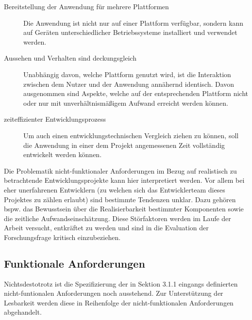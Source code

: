 \begin{description}
    \item[Bereitstellung der Anwendung für mehrere Plattformen] Die Anwendung ist nicht nur auf einer Plattform verfügbar, sondern kann auf Geräten unterschiedlicher Betriebssysteme installiert und verwendet werden.
    \item[Aussehen und Verhalten sind deckungsgleich] Unabhängig davon, welche Plattform genutzt wird, ist die Interaktion zwischen dem Nutzer und der Anwendung annähernd identisch. Davon ausgenommen sind Aspekte, welche auf der entsprechenden Plattform nicht oder nur mit unverhältnismäßigem Aufwand erreicht werden können.
    \item[zeiteffizienter Entwicklungsprozess] Um auch einen entwicklungstechnischen Vergleich ziehen zu können, soll die Anwendung in einer dem Projekt angemessenen Zeit vollständig entwickelt werden können.
\end{description}
Die Problematik nicht-funktionaler Anforderungen im Bezug auf realistisch zu betrachtende Entwicklungsprojekte kann hier interpretiert werden. Vor allem bei eher unerfahrenen Entwicklern (zu welchen sich das Entwicklerteam dieses Projektes zu zählen erlaubt) sind bestimmte Tendenzen unklar. Dazu gehören bspw. das Bewusstsein über die Realisierbarkeit bestimmter Komponenten sowie die zeitliche Aufwandseinschätzung. Diese Störfaktoren werden im Laufe der Arbeit versucht, entkräftet zu werden und sind in die Evaluation der Forschungsfrage kritisch einzubeziehen.

\subsection{Funktionale Anforderungen}
Nichtsdestotrotz ist die Spezifizierung der in Sektion 3.1.1 eingangs definierten nicht-funtionalen Anforderungen noch ausstehend. Zur Unterstützung der Lesbarkeit werden diese in Reihenfolge der nicht-funktionalen Anforderungen abgehandelt.

